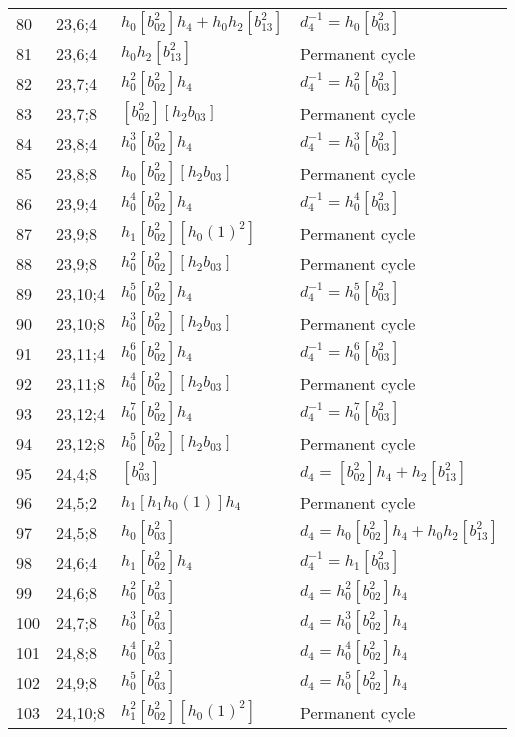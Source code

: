 \documentclass{article}
\begin{document}
\begin{longtable}{|l|l|>{\raggedright\arraybackslash}p{6cm}|>{\raggedright\arraybackslash}p{6cm}|}
80 & 23,6;4 & $h_0[b_{02}^2]h_4 + h_0h_2[b_{13}^2]$ & $d_{4}^{-1}=h_0[b_{03}^2]$\\
81 & 23,6;4 & $h_0h_2[b_{13}^2]$ & Permanent cycle\\
\hline
82 & 23,7;4 & $h_0^2[b_{02}^2]h_4$ & $d_{4}^{-1}=h_0^2[b_{03}^2]$\\
\hline
83 & 23,7;8 & $[b_{02}^2][h_2b_{03}]$ & Permanent cycle\\
\hline
84 & 23,8;4 & $h_0^3[b_{02}^2]h_4$ & $d_{4}^{-1}=h_0^3[b_{03}^2]$\\
\hline
85 & 23,8;8 & $h_0[b_{02}^2][h_2b_{03}]$ & Permanent cycle\\
\hline
86 & 23,9;4 & $h_0^4[b_{02}^2]h_4$ & $d_{4}^{-1}=h_0^4[b_{03}^2]$\\
\hline
87 & 23,9;8 & $h_1[b_{02}^2][h_0(1)^2]$ & Permanent cycle\\
88 & 23,9;8 & $h_0^2[b_{02}^2][h_2b_{03}]$ & Permanent cycle\\
\hline
89 & 23,10;4 & $h_0^5[b_{02}^2]h_4$ & $d_{4}^{-1}=h_0^5[b_{03}^2]$\\
\hline
90 & 23,10;8 & $h_0^3[b_{02}^2][h_2b_{03}]$ & Permanent cycle\\
\hline
91 & 23,11;4 & $h_0^6[b_{02}^2]h_4$ & $d_{4}^{-1}=h_0^6[b_{03}^2]$\\
\hline
92 & 23,11;8 & $h_0^4[b_{02}^2][h_2b_{03}]$ & Permanent cycle\\
\hline
93 & 23,12;4 & $h_0^7[b_{02}^2]h_4$ & $d_{4}^{-1}=h_0^7[b_{03}^2]$\\
\hline
94 & 23,12;8 & $h_0^5[b_{02}^2][h_2b_{03}]$ & Permanent cycle\\
\hline
95 & 24,4;8 & $[b_{03}^2]$ &$d_{4}=[b_{02}^2]h_4 + h_2[b_{13}^2]$\\
\hline
96 & 24,5;2 & $h_1[h_1h_0(1)]h_4$ & Permanent cycle\\
\hline
97 & 24,5;8 & $h_0[b_{03}^2]$ &$d_{4}=h_0[b_{02}^2]h_4 + h_0h_2[b_{13}^2]$\\
\hline
98 & 24,6;4 & $h_1[b_{02}^2]h_4$ & $d_{4}^{-1}=h_1[b_{03}^2]$\\
\hline
99 & 24,6;8 & $h_0^2[b_{03}^2]$ &$d_{4}=h_0^2[b_{02}^2]h_4$\\
\hline
100 & 24,7;8 & $h_0^3[b_{03}^2]$ &$d_{4}=h_0^3[b_{02}^2]h_4$\\
\hline
101 & 24,8;8 & $h_0^4[b_{03}^2]$ &$d_{4}=h_0^4[b_{02}^2]h_4$\\
\hline
102 & 24,9;8 & $h_0^5[b_{03}^2]$ &$d_{4}=h_0^5[b_{02}^2]h_4$\\
\hline
103 & 24,10;8 & $h_1^2[b_{02}^2][h_0(1)^2]$ & Permanent cycle\\

\end{longtable}
\end{document}
